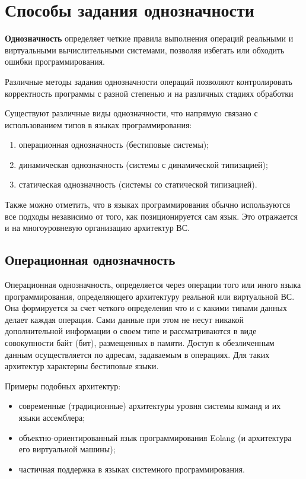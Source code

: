 \section{Способы задания однозначности}

\textbf{Однозначность} определяет четкие правила выполнения операций реальными и виртуальными вычислительными системами, позволяя избегать или обходить ошибки программирования.

Различные методы задания однозначности операций позволяют контролировать корректность программы с разной степенью и на различных стадиях обработки 

Существуют различные виды однозначности, что напрямую связано с использованием типов в языках программирования:
\begin{enumerate}
    \item операционная однозначность (бестиповые системы);
    \item динамическая однозначность (системы с динамической типизацией);
    \item статическая однозначность (системы со статической типизацией).
\end{enumerate}
Также можно отметить, что в языках программирования обычно используются все подходы независимо от того, как позиционируется сам язык. Это отражается и на многоуровневую организацию архитектур ВС.

\subsection{Операционная однозначность}

Операционная однозначность, определяется через операции того или иного языка программирования, определяющего архитектуру реальной или виртуальной ВС. Она формируется за счет четкого определения что и с какими типами данных делает каждая операция. Сами данные при этом не несут никакой дополнительной информации о своем типе и рассматриваются в виде совокупности байт (бит), размещенных в памяти. Доступ к обезличенным данным осуществляется по адресам, задаваемым в операциях. Для таких архитектур характерны бестиповые языки.

Примеры подобных архитектур:
\begin{itemize}
    \item современные (традиционные) архитектуры уровня системы команд и их языки ассемблера;
    \item объектно-ориентированный язык программирования Eolang (и архитектура его виртуальной машины);
    \item частичная поддержка в языках системного программирования.
\end{itemize}

